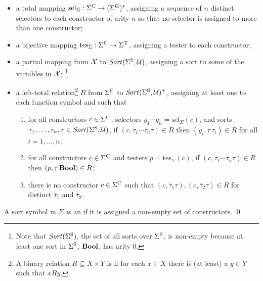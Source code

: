 \begin{definition}
\begin{itemize}
\item
a total mapping $\mathrm{sel}_\Sigma:\Sigma^\mathrm{C} \to (\Sigma^\mathrm{G})^*$,
assigning a sequence of $n$ distinct selectors to each constructor of arity $n$
so that no selector is assigned to more than one constructor;

\item
a bijective mapping $\mathrm{tes}_\Sigma:\Sigma^\mathrm{C} \to \Sigma^\mathrm{T}$,
assigning a tester to each constructor;

\item
a partial mapping from $\mathcal{X}$ to $\mathit{Sort}(\Sigma^\mathrm{S}, \mathcal{U})$,
assigning a sort to some of the variables in $\mathcal{X}$;%
\footnote{%
Note that $\mathit{Sort}(\Sigma^\mathrm{S})$, the set of all sorts over $\Sigma^\mathrm{S}$, is 
non-empty because at least one sort in $\Sigma^\mathrm{S}$, $\textbf{Bool}$, has arity 0.
}

\item
a left-total  relation\footnote{%
A binary relation $R \subseteq X \times Y$ is 
if for each $x \in X$ there is (at least) a $y \in Y$ such that $xRy$.
}
$R$ from $\Sigma^\mathrm{F}$ to $\mathit{Sort}(\Sigma^\mathrm{S}, \mathcal{U})^+$,
assigning at least one  to each function symbol and
such that
\begin{enumerate}
%

\item
for all constructors $c \in \Sigma^\mathrm{C}$, 
selectors $g_1 \cdots g_n = \mathrm{sel}_\Sigma(c)$, and
sorts $\tau_1,\ldots,\tau_n,\tau \in \mathit{Sort}(\Sigma^\mathrm{S}, \mathcal{U})$,
if $(c, \tau_1\cdots\tau_n\tau) \in R$
then $(g_i,\tau\,\tau_i) \in R$ for all $i=1,\ldots,n$;

\item
for all constructors $c \in \Sigma^\mathrm{C}$ and 
testers $p = \mathrm{tes}_\Sigma(c)$,
if $(c, \tau_1\cdots\tau_n\tau) \in R$
then $(p,\tau\,\textbf{Bool}) \in R$;

\item
there is no constructor $c \in \Sigma^\mathrm{C}$ such that
$(c, \bar{\tau}_1\tau), (c, \bar{\tau}_2\tau) \in R$ 
for distinct $\bar{\tau}_1$ and $\bar{\tau}_2$.
\end{enumerate}
\end{itemize}

A sort symbol in $\Sigma$ is an 
if it is assigned a non-empty set of constructors.
\qed
\end{definition}

